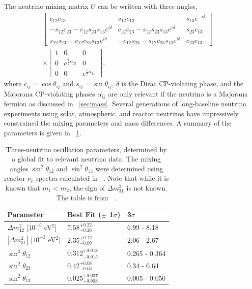 The neutrino mixing matrix $U$ can be written with three angles,
\begin{multline}
\begin{bmatrix}
c_{12}c_{13} & s_{12}c_{13} & s_{13}e^{-i\delta} \\
-s_{12}c_{23}-c_{12}s_{23}s_{13}e^{i\delta} & c_{12}c_{23}-s_{12}s_{23}s_{13}e^{i\delta} & s_{23}c_{13} \\
s_{12}s_{23}-c_{12}c_{23}s_{13}e^{i\delta} & -c_{12}s_{23}-s_{12}c_{23}s_{13}e^{i\delta} & c_{23}c_{13} 
\end{bmatrix} 
\\
\times 
\begin{bmatrix}
1 & 0 & 0 \\
0 & e^{\frac{i}{2}\alpha_{21}} & 0 \\
0 & 0 & e^{\frac{i}{2}\alpha_{31}}
\end{bmatrix}
,
\end{multline}
where $c_{ij} = \cos{\theta_{ij}}$ and $s_{ij} = \sin{\theta_{ij}}$, $\delta$ is the Dirac CP-violating phase, and the Majorana CP-violating phases $\alpha_{ij}$ are only relevant if the neutrino is a Majorana fermion as discussed in {\sect}~\ref{sec:mass}.  Several generations of long-baseline neutrino experiments using solar, atmospheric, and reactor neutrinos have impressively constrained the mixing parameters and mass differences.  A summary of the parameters is given in {\tab}~\ref{tab:neutrinoParameters}.
\begin{table}
\centering
\begin{tabular}{lll}\toprule
Parameter & Best Fit ($\pm$ 1$\sigma$) & 3$\sigma$ \\
\midrule
${\Delta}m^2_{12}$ [$10^{-5}$ eV$^2$] & $7.58^{+0.22}_{-0.26}$ & 6.99 - 8.18 \\
$|{\Delta}m^2_{31}|$ [$10^{-3}$ eV$^2$] & $2.35^{+0.12}_{-0.09}$ & 2.06 - 2.67 \\
$\sin^2{\theta_{12}}$ & $0.312^{+0.018}_{-0.015}$ & 0.265 - 0.364 \\  
$\sin^2{\theta_{23}}$ & $0.42^{+0.08}_{-0.03}$ & 0.34 - 0.64 \\  
$\sin^2{\theta_{13}}$ & $0.025^{+0.007}_{-0.008}$ & 0.005 - 0.050 \\   
\bottomrule  
\end{tabular}
\caption[Neutrino oscillation parameters.]{Three-neutrino oscillation parameters, determined by a global fit to relevant neutrino data.   The mixing angles $\sin^2{\theta_{12}}$ and $\sin^2{\theta_{13}}$ were determined using reactor $\overline{\nu}_e$ spectra calculated in {}~\citep{reactorNeutrinoSpectrum}.  Note that while it is known that $m_1 < m_2$, the sign of ${\Delta}m^2_{31}$ is not known.  The table is from {}~\citep{PDG}.}
\label{tab:neutrinoParameters}
\end{table}
